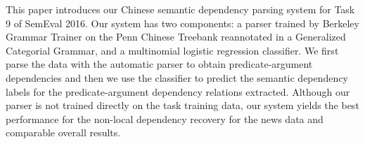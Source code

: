 This paper introduces our Chinese semantic dependency parsing system for Task 9 of SemEval 2016. Our system has two components: a parser trained by Berkeley Grammar Trainer on the Penn Chinese Treebank reannotated in a Generalized Categorial Grammar, and a multinomial logistic regression classifier. We first parse the data with the automatic parser to obtain predicate-argument dependencies and then we use the classifier to predict the semantic dependency labels for the predicate-argument dependency relations extracted. Although our parser is not trained directly on the task training data, our system yields the best performance for the non-local dependency recovery for the news data and comparable overall results.
